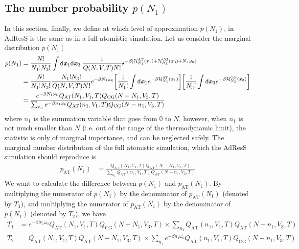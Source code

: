 \documentclass[aip,jcp,a4paper,reprint,onecolumn]{revtex4-1}
\newcommand{\vect}[1]{\textbf{\textit{#1}}}
\newcommand{\dd}[1]{\textsf{#1}}
\newcommand{\AT}{{\textrm{{AT}}}}
\newcommand{\CG}{{\textrm{CG}}}
\begin{document}
\subsection{The number probability $p(N_1)$}
In this section, finally, we define at which level of approximation $p(N_{1})$, in AdResS is the same as in a full atomistic simulation.
Let us consider the marginal distribution $p(N_1)$
\begin{align}\nonumber
  p(N_1)
  &=
  \frac{N!}{N_1!N_3!}
  \int
  \dd d\vect x_1\dd d\vect x_3  \:
  \frac{1}{Q(N,V,T) N!}
  e^{-\beta
    [\mathcal H_{N_1}^{\AT}(\vect x_1) +
    \mathcal H_{N_3}^{\CG}(\vect x_3) +
    N_1\omega_0]}\\\nonumber
  &=
  \frac{N!}{N_1!N_3!}
  \frac{N_1!N_3!}{Q(N,V,T) N!}
  e^{-\beta N_1\omega_0}
  \bigg[
  \frac1{N_1!}
  \int
  \dd d\vect x_1
  e^{-\beta \mathcal H_{N_1}^{\AT}(\vect x_1)}
  \bigg]
  \bigg[
  \frac1{N_3!}
  \int
  \dd d\vect x_3
  e^{-\beta \mathcal H_{N_3}^{\CG}(\vect x_3)}
  \bigg]  \\\label{eqn:pn1}
  &=
  \frac
  {
    e^{-\beta N_1\omega_0}
    Q_{\AT}(N_1,V_1,T) Q_{\CG}(N-N_1,V_3,T)
  }
  {
    \sum_{n_1}
    e^{-\beta n_1\omega_0}
    Q_{\AT}(n_1,V_1,T) Q_{\CG}(N-n_1,V_3,T)
  }
\end{align}
where $n_1$ is the summation variable that goes from 0 to $N$,
however, when $n_1$ is not much smaller than $N$ (i.e. out of the range of the
thermodynamic limit), the statistic is only of marginal importance,
and can be neglected safely.
The marginal number distribution of the full atomistic simulation,
which the AdResS simulation should
reproduce is
\begin{align}
  p_{\AT}(N_1)
  &=
  \frac
  {
    Q_{\AT}(N_1,V_1,T) Q_{\AT}(N-N_1,V_3,T)
  }
  {
    \sum_{n_1}
    Q_{\AT}(n_1,V_1,T) Q_{\AT}(N-n_1,V_3,T)
  }  
\end{align}
We want to calculate the difference between $p(N_1)$ and $p_{\AT}(N_1)$.
By multiplying the numerator of $p(N_1)$ by the denominator of
$p_{\AT}(N_1)$ (denoted by $T_1$),
and multiplying the numerator of $p_{\AT}(N_1)$
by the denominator of $p(N_1)$ (denoted by $T_2$), we have
\begin{align}
  T_1
  &=
  e^{-\beta N_1\omega_0}
  Q_{\AT}(N_1,V_1,T) Q_{\CG}(N-N_1,V_3,T)
  \times
  \sum_{n_1}
  Q_{\AT}(n_1,V_1,T) Q_{\AT}(N-n_1,V_3,T)\\
  T_2
  &=
  Q_{\AT}(N_1,V_1,T) Q_{\AT}(N-N_1,V_3,T)
  \times
  \sum_{n_1}
  e^{-\beta n_1\omega_0}
  Q_{\AT}(n_1,V_1,T) Q_{\CG}(N-n_1,V_3,T)
\end{align}
\end{document}
